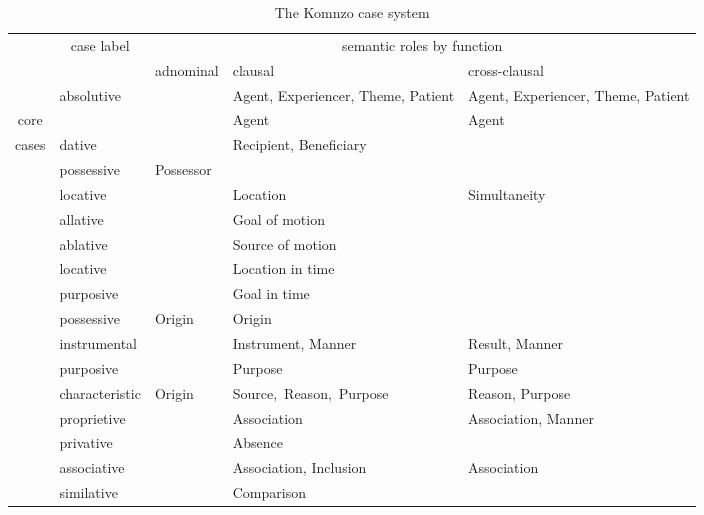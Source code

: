 \begin{table}[t]
\caption{The Komnzo case system} 
\label{caseoverview}
\centering
	\small{%
	\begin{tabular}{|p{2mm}|p{2mm}|p{2cm}|l|>{\raggedright}p{3cm}|>{\raggedright\arraybackslash}p{}|}
		\cline{3-6}
		\multicolumn{2}{c|}{}&\multicolumn{1}{c|}{\multirow{2}{*}{{case label}}}&\multicolumn{3}{c|}{{semantic roles by function}}\\
		\cline{4-6}
		\multicolumn{2}{c|}{}&&{adnominal}&{clausal}&{cross-clausal}\\
		\cline{1-6}
		\multicolumn{2}{|c|}{}&\multirow{2}{*}{{absolutive}}&&Agent, Experiencer, Theme, Patient&Agent, Experiencer, Theme, Patient\\\cline{3-6}
		\multicolumn{2}{|c|}{{core}}&{ergative}&&Agent&Agent\\\cline{3-6}
		\multicolumn{2}{|c|}{{cases}}&{dative}&&Recipient, Beneficiary	&\\\cline{3-6}
		\multicolumn{2}{|c|}{}&{possessive}&Possessor&&\\\hhline{|======|}
		\parbox[t]{4mm}{
						  }&&{locative}&&Location	&Simultaneity\\
		&&{allative}&&Goal of motion&\\
		&&{ablative}&&Source of motion&\\\hhline{|~=====|}
		&&{ locative}&&Location in time&\\
		&&{ purposive}&&Goal in time&\\
		&&{ possessive}&Origin&Origin&\\\hhline{|~=====|}
		&&{instrumental}&&Instrument, Manner&Result, Manner\\
		&&{purposive}&&Purpose&Purpose\\
		&&{characteristic}&Origin& \mbox{Source, Reason, Purpose}&Reason, Purpose\\
		&&{proprietive}&&Association&Association, Manner\\
		&&{privative}&&Absence&\\
		&&{associative}&&Association, Inclusion&Association\\
		&&{similative}&&Comparison&\\		
	\end{tabular}}%
\end{table}%

